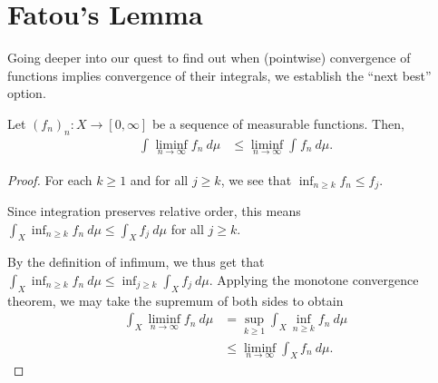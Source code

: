 \documentclass[12pt]{mypackage}
\begin{document}
\section{Fatou's Lemma}%
Going deeper into our quest to find out when (pointwise) convergence of functions implies convergence of their integrals, we establish the ``next best'' option.
\begin{theorem}
  Let $\left( f_n \right)_n\colon X\rightarrow [0,\infty]$ be a sequence of measurable functions. Then,
  \begin{align*}
    \int_{}^{} \liminf_{n\rightarrow\infty}f_n\:d\mu &\leq \liminf_{n\rightarrow\infty} \int_{}^{} f_n\:d\mu.
  \end{align*}
\end{theorem}
\begin{proof}
  For each $k\geq 1$ and for all $j\geq k$, we see that $\inf_{n\geq k}f_n \leq f_j$.\newline

  Since integration preserves relative order, this means $ \int_{X}^{} \inf_{n\geq k}f_n\:d\mu \leq \int_{X}^{} f_j\:d\mu $ for all $j\geq k$.\newline

  By the definition of infimum, we thus get that $ \int_{X}^{} \inf_{n\geq k}f_n\:d\mu \leq \inf_{j\geq k} \int_{X}^{} f_j\:d\mu $. Applying the monotone convergence theorem, we may take the supremum of both sides to obtain
  \begin{align*}
    \int_{X}^{} \liminf_{n\rightarrow\infty} f_n\:d\mu &= \sup_{k\geq 1} \int_{X}^{} \inf_{n\geq k}f_n\:d\mu\\
                                                       &\leq \liminf_{n\rightarrow\infty} \int_{X}^{} f_n\:d\mu.
  \end{align*}
\end{proof}
\end{document}
